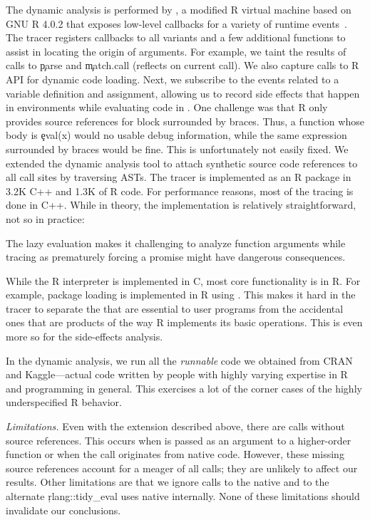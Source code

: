 \documentclass[review,screen,acmsmall,anonymous=true]{acmart}
\newcommand{\mypara}[1]{\medskip\noindent\emph{#1}\xspace}
\begin{document}
The dynamic analysis is performed by \rdyntrace, a modified R virtual machine
based on GNU R 4.0.2 that exposes low-level callbacks for a variety of runtime
events~\cite{oopsla19b}. The tracer registers callbacks to all \eval variants
and a few additional functions to assist in locating the origin of \eval
arguments. For example, we taint the results of calls to \c{parse} and
\c{match.call} (reflects on current call). We also capture calls to R API for
dynamic code loading. Next, we subscribe to the events related to a variable
definition and assignment, allowing us to record side effects that happen in
environments while evaluating code in \eval. One challenge was that R only
provides source references for block surrounded by braces. Thus, a function
whose body is \c{eval(x)} would no usable debug information, while the same
expression surrounded by braces would be fine. This is unfortunately not easily
fixed. We extended the dynamic analysis tool to attach synthetic source code
references to all \eval call sites by traversing ASTs. The tracer is implemented
as an R package in 3.2K C++ and 1.3K of R code. For performance reasons, most of
the tracing is done in C++. While in theory, the implementation is relatively
straightforward, not so in practice:
%
\begin{compactitem}[---]

\item The lazy evaluation makes it challenging to analyze function arguments
  while tracing as prematurely forcing a promise might have dangerous
  consequences.

\item While the R interpreter is implemented in C, most core functionality is in
  R. For example, package loading is implemented in R using \eval. This makes it
  hard in the tracer to separate the \eval that are essential to user programs
  from the accidental ones that are products of the way R implements its basic
  operations. This is even more so for the side-effects analysis.

\item In the dynamic analysis, we run all the \emph{runnable} code we obtained
  from CRAN and Kaggle---\ie actual code written by people with highly varying
  expertise in R and programming in general. This exercises a lot of the corner
  cases of the highly underspecified R behavior.

\end{compactitem}


\mypara{Limitations.} Even with the extension described above, there are
\PkgUndefinedRnd \eval calls without source references. This occurs when \eval
is passed as an argument to a higher-order function or when the \eval call
originates from native code. However, these missing source references account
for a meager \PkgUndefinedRatio of all calls; they are unlikely to affect our
results. Other limitations are that we ignore calls to the native \eval and to
the alternate \c{rlang::tidy\_eval} uses native \eval internally. None of these
limitations should invalidate our conclusions.
\end{document}
